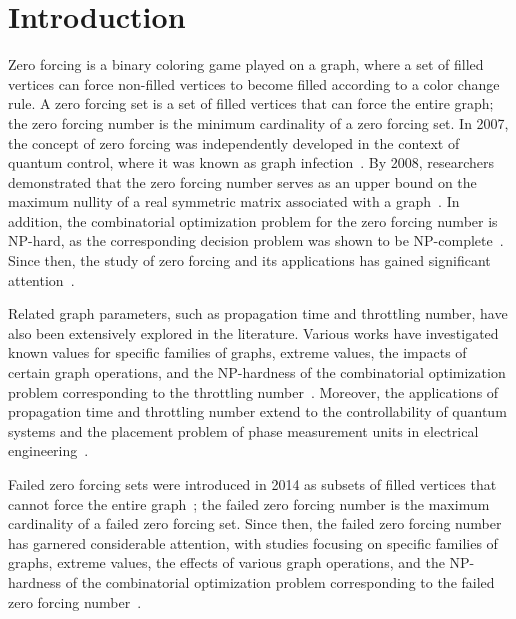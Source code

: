 \documentclass[twoside, 12pt]{article}
\theoremstyle{definition}
\begin{document}
\section{Introduction}\label{sec:intro}
Zero forcing is a binary coloring game played on a graph, where a set of filled vertices can force non-filled vertices to become filled according to a color change rule. A zero forcing set is a set of filled vertices that can force the entire graph; the zero forcing number is the minimum cardinality of a zero forcing set. In 2007, the concept of zero forcing was independently developed in the context of quantum control, where it was known as graph infection~\cite{Burgarth2007}. By 2008, researchers demonstrated that the zero forcing number serves as an upper bound on the maximum nullity of a real symmetric matrix associated with a graph~\cite{AIM2008}. In addition, the combinatorial optimization problem for the zero forcing number is NP-hard, as the corresponding decision problem was shown to be NP-complete~\cite{Aazami2008}. Since then, the study of zero forcing and its applications has gained significant attention~\cite{Hogben2022}.

Related graph parameters, such as propagation time and throttling number, have also been extensively explored in the literature. Various works have investigated known values for specific families of graphs, extreme values, the impacts of certain graph operations, and the NP-hardness of the combinatorial optimization problem corresponding to the throttling number~\cite{Brimkov2019th, Butler2013, Carlson2021, Chilakamarri2012, Hogben2012, Hogben2022}. Moreover, the applications of propagation time and throttling number extend to the controllability of quantum systems and the placement problem of phase measurement units in electrical engineering~\cite{Brueni2005, Severini2008}.

Failed zero forcing sets were introduced in 2014 as subsets of filled vertices that cannot force the entire graph~\cite{Fetcie2015}; the failed zero forcing number is the maximum cardinality of a failed zero forcing set. Since then, the failed zero forcing number has garnered considerable attention, with studies focusing on specific families of graphs, extreme values, the effects of various graph operations, and the NP-hardness of the combinatorial optimization problem corresponding to the failed zero forcing number~\cite{Afzali2024, Fetcie2015, Gomez2021, Gomez2025, Kaudan2023, Shitov2017, Swanson2023}.
\end{document}
